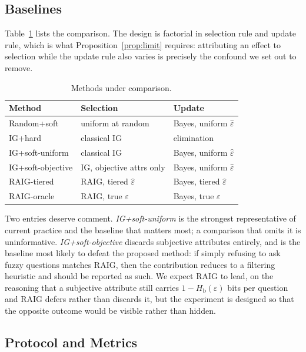 \documentclass[conference]{IEEEtran}
\newcommand{\Hb}{H_{\mathrm{b}}}
\begin{document}
\subsection{Baselines}
\label{sec:baselines}

Table~\ref{tab:baselines} lists the comparison. The design is factorial in
selection rule and update rule, which is what
Proposition~\ref{prop:limit} requires: attributing an effect to selection while
the update rule also varies is precisely the confound we set out to remove.

\begin{table}[t]
\caption{Methods under comparison.}
\label{tab:baselines}
\centering
\footnotesize
\begin{tabular}{@{}lll@{}}
\toprule
\textbf{Method} & \textbf{Selection} & \textbf{Update} \\
\midrule
Random+soft & uniform at random & Bayes, uniform $\hat\varepsilon$ \\
IG+hard & classical IG & elimination \\
IG+soft-uniform & classical IG & Bayes, uniform $\hat\varepsilon$ \\
IG+soft-objective & IG, objective attrs only & Bayes, uniform $\hat\varepsilon$ \\
RAIG-tiered & RAIG, tiered $\hat\varepsilon$ & Bayes, tiered $\hat\varepsilon$ \\
RAIG-oracle & RAIG, true $\varepsilon$ & Bayes, true $\varepsilon$ \\
\bottomrule
\end{tabular}
\end{table}

Two entries deserve comment. \emph{IG+soft-uniform} is the strongest
representative of current practice and the baseline that matters most; a
comparison that omits it is uninformative. \emph{IG+soft-objective} discards
subjective attributes entirely, and is the baseline most likely to defeat the
proposed method: if simply refusing to ask fuzzy questions matches RAIG, then
the contribution reduces to a filtering heuristic and should be reported as
such. We expect RAIG to lead, on the reasoning that a subjective attribute
still carries $1-\Hb(\varepsilon)$ bits per question and RAIG defers rather
than discards it, but the experiment is designed so that the opposite outcome
would be visible rather than hidden.

\subsection{Protocol and Metrics}
\end{document}
